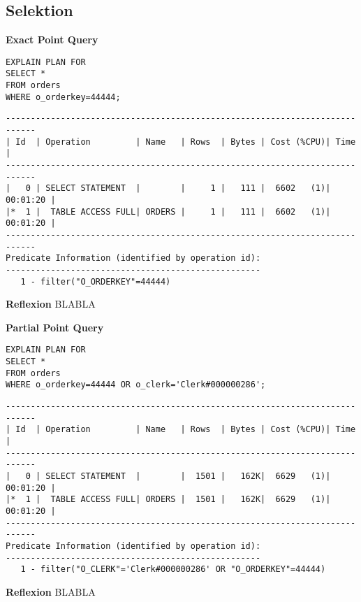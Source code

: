 \documentclass[10pt]{article}
\begin{document}
\subsection{Selektion}
\textbf{Exact Point Query}
\begin{lstlisting}[style=sql]
EXPLAIN PLAN FOR
SELECT *
FROM orders
WHERE o_orderkey=44444;
\end{lstlisting}
\begin{lstlisting}[style=queryexecutionplan]
----------------------------------------------------------------------------
| Id  | Operation         | Name   | Rows  | Bytes | Cost (%CPU)| Time     |
----------------------------------------------------------------------------
|   0 | SELECT STATEMENT  |        |     1 |   111 |  6602   (1)| 00:01:20 |
|*  1 |  TABLE ACCESS FULL| ORDERS |     1 |   111 |  6602   (1)| 00:01:20 |
----------------------------------------------------------------------------
Predicate Information (identified by operation id):
---------------------------------------------------
   1 - filter("O_ORDERKEY"=44444)
\end{lstlisting}
\textbf{Reflexion} \newline
BLABLA

\textbf{Partial Point Query}
\begin{lstlisting}[style=sql]
EXPLAIN PLAN FOR
SELECT *
FROM orders
WHERE o_orderkey=44444 OR o_clerk='Clerk#000000286';
\end{lstlisting}
\begin{lstlisting}[style=queryexecutionplan]
----------------------------------------------------------------------------
| Id  | Operation         | Name   | Rows  | Bytes | Cost (%CPU)| Time     |
----------------------------------------------------------------------------
|   0 | SELECT STATEMENT  |        |  1501 |   162K|  6629   (1)| 00:01:20 |
|*  1 |  TABLE ACCESS FULL| ORDERS |  1501 |   162K|  6629   (1)| 00:01:20 |
----------------------------------------------------------------------------
Predicate Information (identified by operation id):
---------------------------------------------------
   1 - filter("O_CLERK"='Clerk#000000286' OR "O_ORDERKEY"=44444)
\end{lstlisting}
\textbf{Reflexion} \newline
BLABLA
\end{document}
